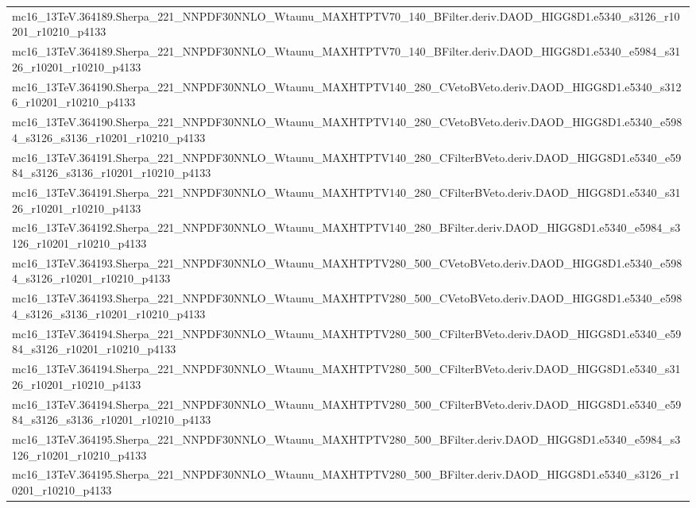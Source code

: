 \begin{adjustwidth}{-3em}{-3em}
\begin{longtable}{l}
mc16\_13TeV.364189.Sherpa\_221\_NNPDF30NNLO\_Wtaunu\_MAXHTPTV70\_140\_BFilter.deriv.DAOD\_HIGG8D1.e5340\_s3126\_r10201\_r10210\_p4133 \\
mc16\_13TeV.364189.Sherpa\_221\_NNPDF30NNLO\_Wtaunu\_MAXHTPTV70\_140\_BFilter.deriv.DAOD\_HIGG8D1.e5340\_e5984\_s3126\_r10201\_r10210\_p4133 \\
mc16\_13TeV.364190.Sherpa\_221\_NNPDF30NNLO\_Wtaunu\_MAXHTPTV140\_280\_CVetoBVeto.deriv.DAOD\_HIGG8D1.e5340\_s3126\_r10201\_r10210\_p4133 \\
mc16\_13TeV.364190.Sherpa\_221\_NNPDF30NNLO\_Wtaunu\_MAXHTPTV140\_280\_CVetoBVeto.deriv.DAOD\_HIGG8D1.e5340\_e5984\_s3126\_s3136\_r10201\_r10210\_p4133 \\
mc16\_13TeV.364191.Sherpa\_221\_NNPDF30NNLO\_Wtaunu\_MAXHTPTV140\_280\_CFilterBVeto.deriv.DAOD\_HIGG8D1.e5340\_e5984\_s3126\_s3136\_r10201\_r10210\_p4133 \\
mc16\_13TeV.364191.Sherpa\_221\_NNPDF30NNLO\_Wtaunu\_MAXHTPTV140\_280\_CFilterBVeto.deriv.DAOD\_HIGG8D1.e5340\_s3126\_r10201\_r10210\_p4133 \\
mc16\_13TeV.364192.Sherpa\_221\_NNPDF30NNLO\_Wtaunu\_MAXHTPTV140\_280\_BFilter.deriv.DAOD\_HIGG8D1.e5340\_e5984\_s3126\_r10201\_r10210\_p4133 \\
mc16\_13TeV.364193.Sherpa\_221\_NNPDF30NNLO\_Wtaunu\_MAXHTPTV280\_500\_CVetoBVeto.deriv.DAOD\_HIGG8D1.e5340\_e5984\_s3126\_r10201\_r10210\_p4133 \\
mc16\_13TeV.364193.Sherpa\_221\_NNPDF30NNLO\_Wtaunu\_MAXHTPTV280\_500\_CVetoBVeto.deriv.DAOD\_HIGG8D1.e5340\_e5984\_s3126\_s3136\_r10201\_r10210\_p4133 \\
mc16\_13TeV.364194.Sherpa\_221\_NNPDF30NNLO\_Wtaunu\_MAXHTPTV280\_500\_CFilterBVeto.deriv.DAOD\_HIGG8D1.e5340\_e5984\_s3126\_r10201\_r10210\_p4133 \\
mc16\_13TeV.364194.Sherpa\_221\_NNPDF30NNLO\_Wtaunu\_MAXHTPTV280\_500\_CFilterBVeto.deriv.DAOD\_HIGG8D1.e5340\_s3126\_r10201\_r10210\_p4133 \\
mc16\_13TeV.364194.Sherpa\_221\_NNPDF30NNLO\_Wtaunu\_MAXHTPTV280\_500\_CFilterBVeto.deriv.DAOD\_HIGG8D1.e5340\_e5984\_s3126\_s3136\_r10201\_r10210\_p4133 \\
mc16\_13TeV.364195.Sherpa\_221\_NNPDF30NNLO\_Wtaunu\_MAXHTPTV280\_500\_BFilter.deriv.DAOD\_HIGG8D1.e5340\_e5984\_s3126\_r10201\_r10210\_p4133 \\
mc16\_13TeV.364195.Sherpa\_221\_NNPDF30NNLO\_Wtaunu\_MAXHTPTV280\_500\_BFilter.deriv.DAOD\_HIGG8D1.e5340\_s3126\_r10201\_r10210\_p4133 \\

\end{longtable}
\end{adjustwidth}
